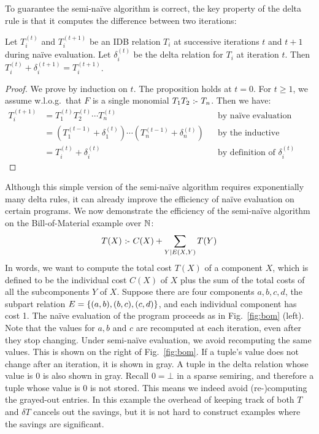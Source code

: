 To guarantee the semi-na\"ive algorithm is correct,
the key property of the delta rule is that it computes the difference
 between two iterations:
%
\begin{prop}
\label{thm:delta}
Let $T_i^{(t)}$ and $T_i^{(t+1)}$ be an IDB relation $T_i$ 
 at successive iterations $t$ and $t+1$ during na\"ive evaluation.
Let $\delta_i^{(t)}$ be the delta relation for $T_i$ at iteration $t$.
Then $T_i^{(t)} + \delta_i^{(t+1)} = T_i^{(t+1)}$.
\end{prop}
%
\begin{proof}
We prove by induction on $t$.
The proposition holds at $t=0$.
For $t\geq 1$, we assume w.l.o.g.\ that $F$ is a single monomial $T_1 T_2 \text{ :- } T_n$.
Then we have:
\begin{align*}
T_i^{(t+1)} & = T_1^{(t)} T_2^{(t)} \cdots T_n^{(t)} && \text{by na\"ive evaluation} \\ 
 & = (T_1^{(t-1)} + \delta_1^{(t)}) \cdots (T_n^{(t-1)} + \delta_n^{(t)}) && \text{by the inductive hypothesis} \\
 & = T_i^{(t)} + \delta_i^{(t)} && \text{by definition of $\delta_i^{(t)}$}
\end{align*}
\end{proof}

Although this simple version of the semi-na\"ive algorithm requires exponentially
 many delta rules, it can already improve the efficiency of na\"ive evaluation
 on certain programs.
We now demonstrate the efficiency of the semi-na\"ive algorithm on the Bill-of-Material example 
 over $\mathbb N$:
%
$$ T(X) \text{ :- } C(X) + \sum_{Y \mid E(X, Y)} T(Y) $$
%
In words, we want to compute the total cost $T(X)$ of a component $X$, 
 which is defined to be the individual cost $C(X)$ of $X$ 
 plus the sum of the total costs of all the subcomponents $Y$ of $X$.
Suppose there are four components $a, b, c, d$, 
 the subpart relation $E = \{ (a, b), (b, c), (c, d)\}$, 
 and each individual component has cost 1.
The na\"ive evaluation of the program proceeds as in Fig.~\ref{fig:bom} (left).
Note that the values for $a, b$ and $c$ are recomputed at each iteration, 
 even after they stop changing.
Under semi-na\"ive evaluation, we avoid recomputing the same values.
This is shown on the right of Fig.~\ref{fig:bom}.
If a tuple's value does not change after an iteration, 
 it is shown in gray.
A tuple in the delta relation whose value is 0 is also shown in gray.
Recall $0 = \bot$ in a sparse semiring,
 and therefore a tuple whose value is 0 is not stored.
This means we indeed avoid (re-)computing the grayed-out entries.
In this example the overhead of keeping track of both $T$ 
 and $\delta T$ cancels out the savings, 
 but it is not hard to construct examples where the savings are significant. 

